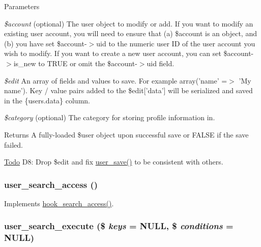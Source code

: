 \begin{DoxyParams}{Parameters}
\item[{\em \$account}](optional) The user object to modify or add. If you want to modify an existing user account, you will need to ensure that (a) \$account is an object, and (b) you have set \$account-\/$>$uid to the numeric user ID of the user account you wish to modify. If you want to create a new user account, you can set \$account-\/$>$is\_\-new to TRUE or omit the \$account-\/$>$uid field. \item[{\em \$edit}]An array of fields and values to save. For example array('name' =$>$ 'My name'). Key / value pairs added to the \$edit\mbox{[}'data'\mbox{]} will be serialized and saved in the \{users.data\} column. \item[{\em \$category}](optional) The category for storing profile information in.\end{DoxyParams}
\begin{DoxyReturn}{Returns}
A fully-\/loaded \$user object upon successful save or FALSE if the save failed.
\end{DoxyReturn}
\begin{Desc}
\item[\hyperlink{todo__todo000024}{Todo}]D8: Drop \$edit and fix \hyperlink{user_8module_a857b652072abb243e0b44b02c3746a99}{user\_\-save()} to be consistent with others. \end{Desc}
\hypertarget{user_8module_ac25873e619ada5dcb08431674667e7ee}{
\subsubsection[{user\_\-search\_\-access}]{\setlength{\rightskip}{0pt plus 5cm}user\_\-search\_\-access ()}}
\label{user_8module_ac25873e619ada5dcb08431674667e7ee}
Implements \hyperlink{group__search_gac49e6fd7370e65efeaf484ec992de1f0}{hook\_\-search\_\-access()}. \hypertarget{user_8module_a04e2120f38c081b16387b631602cc47f}{
\subsubsection[{user\_\-search\_\-execute}]{\setlength{\rightskip}{0pt plus 5cm}user\_\-search\_\-execute (\$ {\em keys} = {\ttfamily NULL}, \/  \$ {\em conditions} = {\ttfamily NULL})}}
